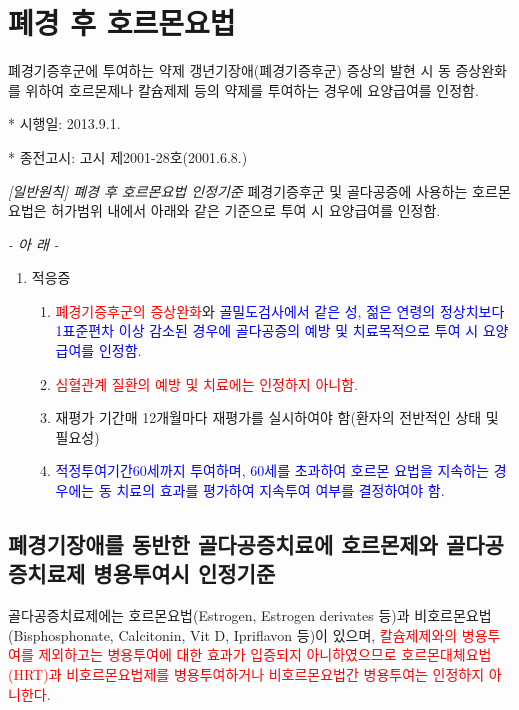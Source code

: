 \section{폐경 후 호르몬요법 }
{
\begin{commentbox}{폐경기증후군에 투여하는 약제}  
갱년기장애(폐경기증후군) 증상의 발현 시 동 증상완화를 위하여 호르몬제나 칼슘제제 등의 약제를 투여하는 경우에 요양급여를 인정함.\par
* 시행일: 2013.9.1.\par
* 종전고시: 고시 제2001-28호(2001.6.8.)
\end{commentbox}
\emph{[일반원칙] 폐경 후 호르몬요법 인정기준}
폐경기증후군 및 골다공증에 사용하는 호르몬요법은 허가범위 내에서 아래와 같은 기준으로 투여 시 요양급여를 인정함.
\par
\begin{center}\emph{- 아     래 -}\end{center}
\begin{enumerate}[가.]\tightlist
\item 적응증 
	\begin{enumerate}[1)]\tightlist
	\item \textcolor{red}{폐경기증후군의 증상완화}와 \textcolor{blue}{골밀도검사에서 같은 성, 젊은 연령의 정상치보다 1표준편차 이상 감소된 경우에 골다공증의 예방 및 치료목적으로 투여 시 요양급여를 인정함.} 
	\item \textcolor{red}{심혈관계 질환의 예방 및 치료에는 인정하지 아니함.}
	\item 재평가 기간매 12개월마다 재평가를 실시하여야 함(환자의 전반적인 상태 및 필요성) 
	\item \textcolor{blue}{적정투여기간60세까지 투여하며, 60세를 초과하여 호르몬 요법을 지속하는 경우에는 동 치료의 효과를 평가하여 지속투여 여부를 결정하여야 함.}
	\end{enumerate}
\end{enumerate}
}
\subsection{폐경기장애를 동반한 골다공증치료에 호르몬제와 골다공증치료제 병용투여시 인정기준}
골다공증치료제에는 호르몬요법(Estrogen, Estrogen derivates 등)과 비호르몬요법(Bisphosphonate, Calcitonin, Vit D, Ipriflavon 등)이 있으며, \textcolor{red}{칼슘제제와의 병용투여를 제외하고는 병용투여에 대한 효과가 입증되지 아니하였으므로 호르몬대체요법(HRT)과 비호르몬요법제를 병용투여하거나 비호르몬요법간 병용투여는 인정하지 아니한다.}
